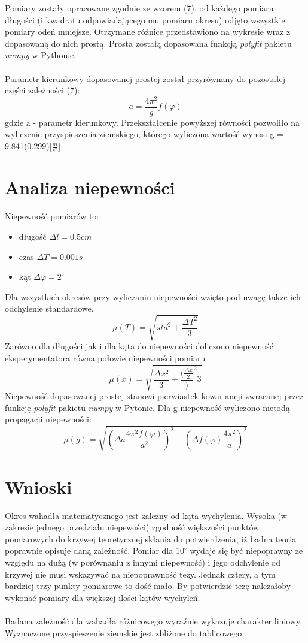 \documentclass[a4paper,10pt]{article}
\begin{document}
Pomiary zostały opracowane zgodnie ze wzorem (7), od każdego pomiaru długości (i kwadratu odpowiadającego mu pomiaru okresu) odjęto wszystkie pomiary odeń mniejsze. Otrzymane różnice przedstawiono na wykresie wraz z dopasowaną do nich prostą. Prosta zostałą dopasowana funkcją \emph{polyfit} pakietu \emph{numpy} 
w Pythonie.\\
\\
Parametr kierunkowy dopasowanej prostej został przyrównany do pozostałej części zależności (7):
\begin{equation}
a = \frac{4 \pi^2}{g} f(\varphi)
\end{equation}
gdzie a - parametr kierunkowy. Przekształcenie powyższej równości pozwoliło na wyliczenie przyspieszenia ziemskiego, którego wyliczona wartość wynosi g = 9.841(0.299)[$\frac{m}{s^2}$]
\section{Analiza niepewności}
Niepewność pomiarów to:
\begin{itemize}
	\item długość $\Delta l = 0.5 cm$
	\item czas $\Delta T = 0.001 s$
	\item kąt $\Delta \varphi = 2 ^\circ$
\end{itemize}
Dla wszystkich okresów przy wyliczaniu niepewności wzięto pod uwagę także ich odchylenie standardowe. 
$$\mu(T) = \sqrt{std^2 + \frac{\Delta T^2}{3}}$$
Zarówno dla długości jak i dla kąta do niepewności doliczono niepewność eksperymentatora równa połowie niepewności pomiaru
$$\mu(x) = \sqrt{\frac{\Delta x^2}{3}+\frac{(\frac{\Delta x}{2}})^2{3}}$$
Niepewność dopasowanej prostej stanowi pierwiastek kowariancji zwracanej przez funkcję \emph{polyfit} pakietu \emph{numpy} w Pytonie. Dla g niepewność wyliczono metodą propagacji niepewności:
$$\mu(g) = \sqrt{(\Delta a \frac{4 \pi^2 f(\varphi)}{a^2})^2+(\Delta f(\varphi) \frac{4 \pi^2}{a})^2}$$
\section{Wnioski}
Okres wahadła matematycznego jest zależny od kąta wychylenia. Wysoka (w zakresie jednego przedziału niepewości) zgodność większości punktów pomiarowych do krzywej teoretycznej skłania do potwierdzenia, iż badna teoria poprawnie opisuje daną zależność. Pomiar dla $10^\circ$ wydaje się być niepoprawny ze względu na dużą (w porównaniu z innymi niepewność) i jego odchylenie od krzywej nie musi wskazywać na niepoprawność tezy. Jednak cztery, a tym bardziej trzy punkty pomiarowe to dość mało. By potwierdzić tezę należałoby wykonać pomiary dla większej ilości kątów wychyleń.\\
\\
Badana zależność dla wahadła różnicowego wyraźnie wykazuje charakter liniowy. Wyznaczone przyspieszenie ziemskie jest zbliżone do tablicowego. %
\end{document}
